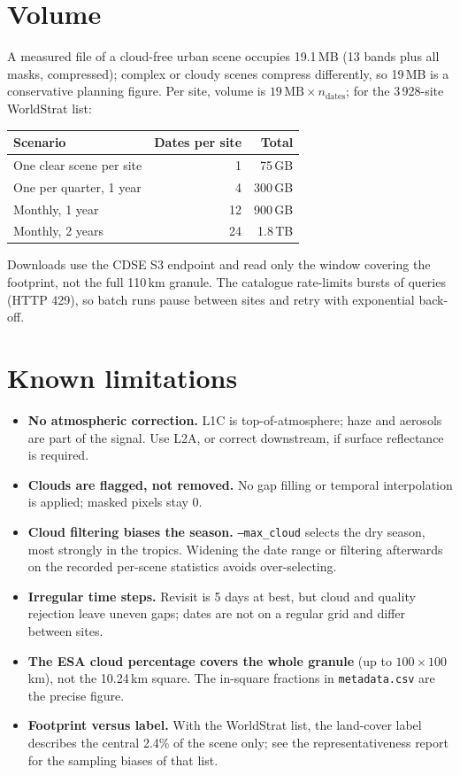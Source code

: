 \documentclass[10pt,a4paper]{article}
\begin{document}
\section{Volume}

A measured file of a cloud-free urban scene occupies 19.1\,MB (13 bands plus all masks,
compressed); complex or cloudy scenes compress differently, so 19\,MB is a conservative planning
figure. Per site, volume is $19\,\text{MB}\times n_{\text{dates}}$; for the 3\,928-site
WorldStrat list:

\begin{center}
\small
\begin{tabular}{lrr}
\toprule
Scenario & Dates per site & Total \\
\midrule
One clear scene per site & 1 & 75\,GB \\
One per quarter, 1 year & 4 & 300\,GB \\
Monthly, 1 year & 12 & 900\,GB \\
Monthly, 2 years & 24 & 1.8\,TB \\
\bottomrule
\end{tabular}
\end{center}

Downloads use the CDSE S3 endpoint and read only the window covering the footprint, not the full
110\,km granule. The catalogue rate-limits bursts of queries (HTTP 429), so batch runs pause
between sites and retry with exponential back-off.

\section{Known limitations}

\begin{itemize}\setlength{\itemsep}{0pt}
  \item \textbf{No atmospheric correction.} L1C is top-of-atmosphere; haze and aerosols are part
        of the signal. Use L2A, or correct downstream, if surface reflectance is required.
  \item \textbf{Clouds are flagged, not removed.} No gap filling or temporal interpolation is
        applied; masked pixels stay 0.
  \item \textbf{Cloud filtering biases the season.} \texttt{--max\_cloud} selects the dry season,
        most strongly in the tropics. Widening the date range or filtering afterwards on the
        recorded per-scene statistics avoids over-selecting.
  \item \textbf{Irregular time steps.} Revisit is 5 days at best, but cloud and quality rejection
        leave uneven gaps; dates are not on a regular grid and differ between sites.
  \item \textbf{The ESA cloud percentage covers the whole granule} (up to $100\times100$\,km),
        not the 10.24\,km square. The in-square fractions in \texttt{metadata.csv} are the
        precise figure.
  \item \textbf{Footprint versus label.} With the WorldStrat list, the land-cover label describes
        the central 2.4\% of the scene only; see the representativeness report for the sampling
        biases of that list.
\end{itemize}
\end{document}
